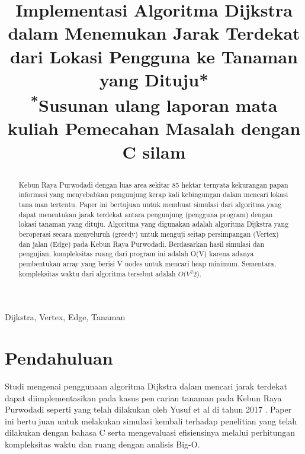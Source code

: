 \documentclass[conference]{IEEEtran}
\begin{document}
\title{Implementasi Algoritma Dijkstra dalam Menemukan Jarak Terdekat dari Lokasi Pengguna ke Tanaman yang Dituju*\\
{\footnotesize \textsuperscript{*}Susunan ulang laporan mata kuliah Pemecahan Masalah dengan C silam}

}

\author{

}

\maketitle

\begin{abstract}
Kebun Raya Purwodadi dengan luas area sekitar 85 hektar ternyata kekurangan papan informasi yang menyebabkan pengunjung kerap kali kebingungan dalam mencari lokasi tanaman tertentu. Paper ini bertujuan untuk membuat simulasi dari algoritma yang dapat menentukan jarak terdekat antara pengunjung (pengguna program) dengan lokasi tanaman yang dituju. Algoritma yang digunakan adalah algoritma Dijkstra yang beroperasi secara menyeluruh (greedy) untuk menguji seitap persimpangan (Vertex) dan jalan (Edge) pada Kebun Raya Purwodadi. Berdasarkan hasil simulasi dan pengujian, kompleksitas ruang dari program ini adalah O(V) karena adanya pembentukan array yang berisi V nodes untuk mencari heap minimum. Sementara, kompleksitas waktu dari algoritma tersebut adalah $ O(V^{2} $2).

\end{abstract}

\begin{IEEEkeywords}
Dijkstra, Vertex, Edge, Tanaman
\end{IEEEkeywords}

\section{Pendahuluan}
Studi mengenai penggunaan algoritma Dijkstra dalam mencari jarak terdekat dapat diimplementasikan pada kasus pencarian tanaman pada Kebun Raya Purwodadi seperti yang telah dilakukan oleh Yusuf et al di tahun 2017 \cite{b1}. Paper ini bertujuan untuk melakukan simulasi kembali terhadap penelitian yang telah dilakukan dengan bahasa C serta mengevaluasi efisiensinya melalui perhitungan kompleksitas waktu dan ruang dengan analisis Big-O.
\end{document}
